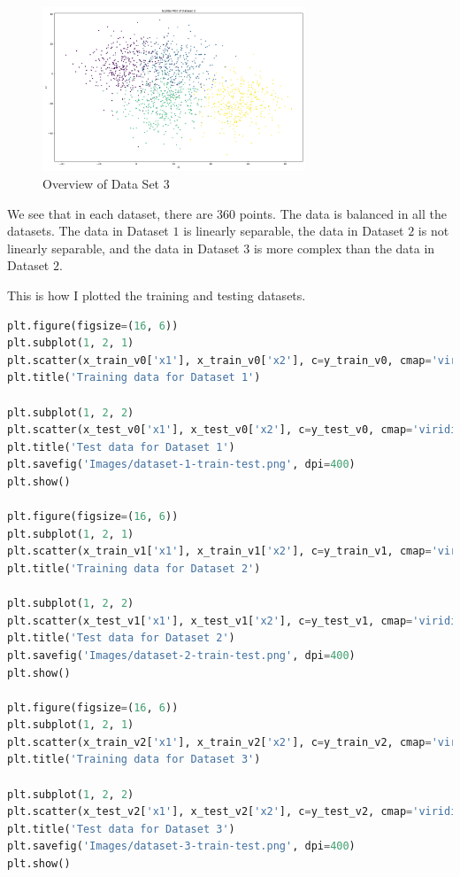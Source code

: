 \begin{figure}[H]
    \centering
    \includegraphics[width=0.7\textwidth]{Images/dataset-3-overview.png}
    \caption{Overview of Data Set 3}
\end{figure}

We see that in each dataset, there are $360$ points. The data is balanced in all the datasets. The data in Dataset $1$ is linearly separable, the data in Dataset $2$ is not linearly separable, and the data in Dataset $3$ is more complex than the data in Dataset $2$.

This is how I plotted the training and testing datasets.

\begin{lstlisting}[language=Python, caption=Plotting the Training and Testing Datasets]
plt.figure(figsize=(16, 6))
plt.subplot(1, 2, 1)
plt.scatter(x_train_v0['x1'], x_train_v0['x2'], c=y_train_v0, cmap='viridis', s=10)
plt.title('Training data for Dataset 1')

plt.subplot(1, 2, 2)
plt.scatter(x_test_v0['x1'], x_test_v0['x2'], c=y_test_v0, cmap='viridis', s=10)
plt.title('Test data for Dataset 1')
plt.savefig('Images/dataset-1-train-test.png', dpi=400)
plt.show()

plt.figure(figsize=(16, 6))
plt.subplot(1, 2, 1)
plt.scatter(x_train_v1['x1'], x_train_v1['x2'], c=y_train_v1, cmap='viridis', s=10)
plt.title('Training data for Dataset 2')

plt.subplot(1, 2, 2)
plt.scatter(x_test_v1['x1'], x_test_v1['x2'], c=y_test_v1, cmap='viridis', s=10)
plt.title('Test data for Dataset 2')
plt.savefig('Images/dataset-2-train-test.png', dpi=400)
plt.show()

plt.figure(figsize=(16, 6))
plt.subplot(1, 2, 1)
plt.scatter(x_train_v2['x1'], x_train_v2['x2'], c=y_train_v2, cmap='viridis', s=10)
plt.title('Training data for Dataset 3')

plt.subplot(1, 2, 2)
plt.scatter(x_test_v2['x1'], x_test_v2['x2'], c=y_test_v2, cmap='viridis', s=10)
plt.title('Test data for Dataset 3')
plt.savefig('Images/dataset-3-train-test.png', dpi=400)
plt.show()
\end{lstlisting}

